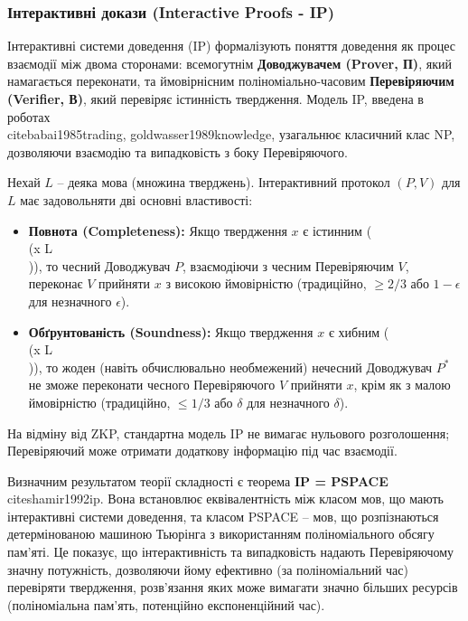 \documentclass[a4paper,12pt]{article}
\begin{document}
    \subsubsection{Інтерактивні докази (Interactive Proofs - IP)} %
    Інтерактивні системи доведення (IP) формалізують поняття доведення як процес взаємодії між двома сторонами: всемогутнім \textbf{Доводжувачем (Prover, П)}, який намагається переконати, та ймовірнісним поліноміально-часовим \textbf{Перевіряючим (Verifier, В)}, який перевіряє істинність твердження. Модель IP, введена в роботах \\cite{babai1985trading, goldwasser1989knowledge}, узагальнює класичний клас NP, дозволяючи взаємодію та випадковість з боку Перевіряючого.

    Нехай \(L\) -- деяка мова (множина тверджень). Інтерактивний протокол \((P, V)\) для \(L\) має задовольняти дві основні властивості:
    \begin{itemize}
        \item \textbf{Повнота (Completeness):} Якщо твердження \(x\) є істинним (\\(x \in L\\)), то чесний Доводжувач \(P\), взаємодіючи з чесним Перевіряючим \(V\), переконає \(V\) прийняти \(x\) з високою ймовірністю (традиційно, \(\ge 2/3\) або \(1-\epsilon\) для незначного \(\epsilon\)).
        \item \textbf{Обґрунтованість (Soundness):} Якщо твердження \(x\) є хибним (\\(x \notin L\\)), то жоден (навіть обчислювально необмежений) нечесний Доводжувач \(P^*\) не зможе переконати чесного Перевіряючого \(V\) прийняти \(x\), крім як з малою ймовірністю (традиційно, \(\le 1/3\) або \(\delta\) для незначного \(\delta\)).
    \end{itemize}

    На відміну від ZKP, стандартна модель IP не вимагає нульового розголошення; Перевіряючий може отримати додаткову інформацію під час взаємодії.

    Визначним результатом теорії складності є теорема \textbf{IP = PSPACE} \\cite{shamir1992ip}. Вона встановлює еквівалентність між класом мов, що мають інтерактивні системи доведення, та класом PSPACE -- мов, що розпізнаються детермінованою машиною Тьюрінга з використанням поліноміального обсягу пам'яті. Це показує, що інтерактивність та випадковість надають Перевіряючому значну потужність, дозволяючи йому ефективно (за поліноміальний час) перевіряти твердження, розв'язання яких може вимагати значно більших ресурсів (поліноміальна пам'ять, потенційно експоненційний час).
\end{document}

